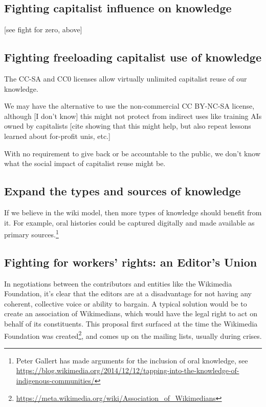 \documentclass[format=sigconf, authorversion]{acmart}
\begin{document}
\subsection{Fighting capitalist influence on knowledge}

[see fight for zero, above]

\subsection{Fighting freeloading capitalist use of knowledge}

The CC-SA and CC0 licenses allow virtually unlimited capitalist reuse of our knowledge.

We may have the alternative to use the non-commercial CC BY-NC-SA license, although [I don't know] this might not protect from indirect uses like training AIs owned by capitalists [cite showing that this might help, but also repeat lessons learned about for-profit unis, etc.]

With no requirement to give back or be accountable to the public, we don't know what the social impact of capitalist reuse might be.

\subsection{Expand the types and sources of knowledge}

If we believe in the wiki model, then more types of knowledge should benefit from it.  For example, oral histories could be captured digitally and made available as primary sources.\footnote{Peter Gallert has made arguments for the inclusion of oral knowledge, see \url{https://blog.wikimedia.org/2014/12/12/tapping-into-the-knowledge-of-indigenous-communities/}}

\subsection{Fighting for workers' rights: an Editor's Union}

In negotiations between the contributors and entities like the Wikimedia Foundation, it's clear that the editors are at a disadvantage for not having any coherent, collective voice or ability to bargain.  A typical solution would be to create an association of Wikimedians, which would have the legal right to act on behalf of its constituents.  This proposal first surfaced at the time the Wikimedia Foundation was created\footnote{\url{https://meta.wikimedia.org/wiki/Association_of_Wikimedians}}, and comes up on the mailing lists, usually during crises.
\end{document}
